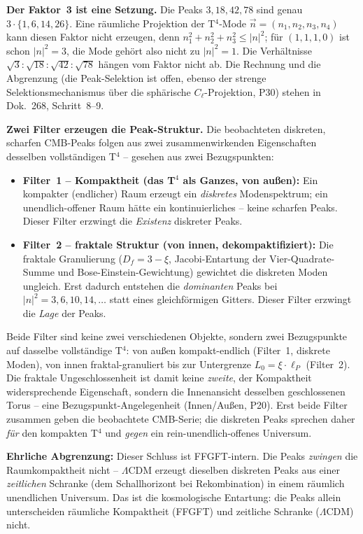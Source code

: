 \textbf{Der Faktor~3 ist eine Setzung.}
Die Peaks $3, 18, 42, 78$ sind genau $3 \cdot \{1, 6, 14, 26\}$. Eine
räumliche Projektion der T$^4$-Mode $\vec{n} = (n_1, n_2, n_3, n_4)$ kann
diesen Faktor nicht erzeugen, denn $n_1^2+n_2^2+n_3^2\le|n|^2$; für
$(1,1,1,0)$ ist schon $|n|^2=3$, die Mode gehört also nicht zu $|n|^2=1$.
Die Verhältnisse $\sqrt3:\sqrt{18}:\sqrt{42}:\sqrt{78}$ hängen vom Faktor
nicht ab. Die Rechnung und die Abgrenzung (die Peak-Selektion ist offen,
ebenso der strenge Selektionsmechanismus über die sphärische
$C_\ell$-Projektion, P30) stehen in Dok.~268, Schritt~8--9.

\textbf{Zwei Filter erzeugen die Peak-Struktur.} Die beobachteten
diskreten, scharfen CMB-Peaks folgen aus zwei zusammenwirkenden
Eigenschaften desselben vollständigen T$^4$ -- gesehen aus zwei
Bezugspunkten:

\begin{itemize}
  \item \textbf{Filter~1 -- Kompaktheit (das T$^4$ als Ganzes, von außen):}
        Ein kompakter (endlicher) Raum erzeugt ein \emph{diskretes}
        Modenspektrum; ein unendlich-offener Raum hätte ein
        kontinuierliches -- keine scharfen Peaks. Dieser Filter
        erzwingt die \emph{Existenz} diskreter Peaks.
  \item \textbf{Filter~2 -- fraktale Struktur (von innen, dekompaktifiziert):}
        Die fraktale Granulierung ($D_f = 3-\xi$, Jacobi-Entartung der
        Vier-Quadrate-Summe und Bose-Einstein-Gewichtung) gewichtet
        die diskreten Moden ungleich. Erst dadurch entstehen die
        \emph{dominanten} Peaks bei $|n|^2 = 3, 6, 10, 14, \ldots$
        statt eines gleichförmigen Gitters. Dieser Filter erzwingt die
        \emph{Lage} der Peaks.
\end{itemize}

Beide Filter sind keine zwei verschiedenen Objekte, sondern zwei
Bezugspunkte auf dasselbe vollständige T$^4$: von außen kompakt-endlich
(Filter~1, diskrete Moden), von innen fraktal-granuliert bis zur
Untergrenze $L_0 = \xi\cdot\ell_P$ (Filter~2). Die fraktale
Ungeschlossenheit ist damit keine \emph{zweite}, der Kompaktheit
widersprechende Eigenschaft, sondern die Innenansicht desselben
geschlossenen Torus -- eine Bezugspunkt-Angelegenheit (Innen/Außen,
P20). Erst beide Filter zusammen geben die beobachtete CMB-Serie;
die diskreten Peaks sprechen daher \emph{für} den kompakten T$^4$
und \emph{gegen} ein rein-unendlich-offenes Universum.

\textbf{Ehrliche Abgrenzung:} Dieser Schluss ist FFGFT-intern. Die
Peaks \emph{zwingen} die Raumkompaktheit nicht -- $\Lambda$CDM erzeugt
dieselben diskreten Peaks aus einer \emph{zeitlichen} Schranke (dem
Schallhorizont bei Rekombination) in einem räumlich unendlichen
Universum. Das ist die kosmologische Entartung: die Peaks allein
unterscheiden räumliche Kompaktheit (FFGFT) und zeitliche Schranke
($\Lambda$CDM) nicht.

